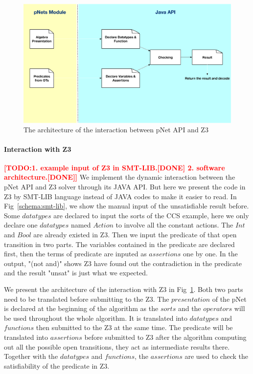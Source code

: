 \documentclass{lncs/llncs}
\newcommand{\TODO}[1]{\textcolor{red}{\textbf{[TODO:#1]}}}
\newcommand{\QIN}[1]{\textcolor{airforceblue}{#1}}
\begin{document}
\begin{figure}[t]
  \includegraphics[width=\linewidth]{XFIG/Interaction}
  \caption{The architecture of the interaction between pNet API and Z3}  \label{schema:interaction}
\end{figure}

\paragraph{Interaction with Z3}
\TODO{1. example input of Z3 in SMT-LIB.[DONE] 2. software architecture.[DONE]}
\QIN{
We implement the dynamic interaction between the pNet API and Z3 solver through its JAVA API. But here we present the code in Z3 by SMT-LIB language instead of JAVA codes to make it easier to read. In Fig~\ref{schema:smt-lib}, we show the manual input of the unsatisfiable result before. Some $datatypes$ are declared to input the sorts of the CCS example, here we only declare one $datatypes$ named $Action$ to involve all the constant actions. The $Int$ and $Bool$ are already existed in Z3. Then we input the predicate of that open transition in two parts. The variables contained in the predicate are declared first, then the terms of predicate are inputed as $assertions$ one by one. In the output, "(not and)" shows Z3 have found out the contradiction in the predicate and the result "unsat" is just what we expected.  
}

\QIN{
We present the architecture of the interaction with Z3 in Fig~\ref{schema:interaction}. Both two parts need to be translated before submitting to the Z3. The $presentation$ of the pNet is declared at the beginning of the algorithm as the $sorts$ and the $operators$ will be used throughout the whole algorithm. It is translated into $datatypes$ and $functions$ then submitted to the Z3 at the same time. The predicate will be translated into $assertions$ before submitted to Z3 after the algorithm computing out all the possible open transitions, they act as intermediate results there. Together with the $datatypes$ and $functions$, the $assertions$ are used to check the satisfiability of the predicate in Z3.
}
\end{document}
